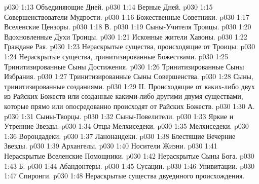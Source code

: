 \vs p030 1:13 \bibnobreakspace Объединяющие Дней.
\vs p030 1:14 \bibnobreakspace Верные Дней.
\vs p030 1:15 \bibnobreakspace Совершенствователи Мудрости.
\vs p030 1:16 \bibnobreakspace Божественные Советники.
\vs p030 1:17 \bibnobreakspace Вселенские Цензоры.
\vs p030 1:18 \pc В. 
\vs p030 1:19 \bibnobreakspace Сыны\hyp{}Учителя Троицы.
\vs p030 1:20 \bibnobreakspace Вдохновленные Духи Троицы.
\vs p030 1:21 \bibnobreakspace Исконные жители Хавоны.
\vs p030 1:22 \bibnobreakspace Граждане Рая.
\vs p030 1:23 \bibnobreakspace Нераскрытые существа, происходящие от Троицы.
\vs p030 1:24 \bibnobreakspace Нераскрытые существа, тринитизированные Божествами.
\vs p030 1:25 \bibnobreakspace Тринитизированные Сыны Достижения.
\vs p030 1:26 \bibnobreakspace Тринитизированные Сыны Избрания.
\vs p030 1:27 \bibnobreakspace Тринитизированные Сыны Совершенства.
\vs p030 1:28 \bibnobreakspace Сыны, тринитизированные созданиями.
\vs p030 1:29 \pc II.  Происходящие от каких\hyp{}либо двух из Райских Божеств или созданные какими\hyp{}либо другими двумя существами, которые прямо или опосредованно происходят от Райских Божеств.
\vs p030 1:30 \pc А. 
\vs p030 1:31 \bibnobreakspace Сыны\hyp{}Творцы.
\vs p030 1:32 \bibnobreakspace Сыны\hyp{}Повелители.
\vs p030 1:33 \bibnobreakspace Яркие и Утренние Звезды.
\vs p030 1:34 \bibnobreakspace Отцы\hyp{}Мелхиседеки.
\vs p030 1:35 \bibnobreakspace Мелхиседеки.
\vs p030 1:36 \bibnobreakspace Ворондадеки.
\vs p030 1:37 \bibnobreakspace Ланонандеки.
\vs p030 1:38 \bibnobreakspace Блестящие Вечерние Звезды.
\vs p030 1:39 \bibnobreakspace Архангелы.
\vs p030 1:40 \bibnobreakspace Носители Жизни.
\vs p030 1:41 \bibnobreakspace Нераскрытые Вселенские Помощники.
\vs p030 1:42 \bibnobreakspace Нераскрытые Сыны Бога.
\vs p030 1:43 \pc Б. 
\vs p030 1:44 \bibnobreakspace Абандонтеры.
\vs p030 1:45 \bibnobreakspace Сусации.
\vs p030 1:46 \bibnobreakspace Унивитации.
\vs p030 1:47 \bibnobreakspace Спиронги.
\vs p030 1:48 \bibnobreakspace Нераскрытые существа двуединого происхождения.

